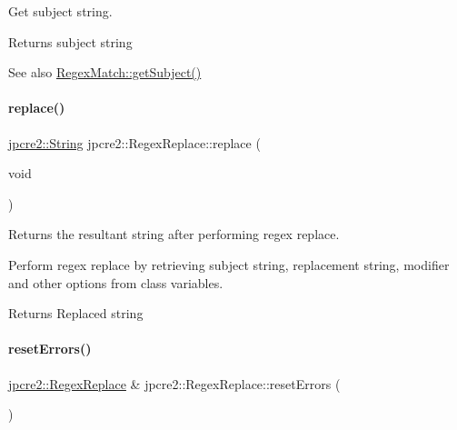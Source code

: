 Get subject string. 

\begin{DoxyReturn}{Returns}
subject string 
\end{DoxyReturn}
\begin{DoxySeeAlso}{See also}
\hyperlink{classjpcre2_1_1RegexMatch_a6ebe41305bcc7262bec814e9e737d056_a6ebe41305bcc7262bec814e9e737d056}{Regex\+Match\+::get\+Subject()} 
\end{DoxySeeAlso}
\hypertarget{classjpcre2_1_1RegexReplace_afd087fa7a9bfedec802d1a3dd7edbdd0_afd087fa7a9bfedec802d1a3dd7edbdd0}{}\label{classjpcre2_1_1RegexReplace_afd087fa7a9bfedec802d1a3dd7edbdd0_afd087fa7a9bfedec802d1a3dd7edbdd0} 
\paragraph{\texorpdfstring{replace()}{replace()}}
{\footnotesize\ttfamily \hyperlink{namespacejpcre2_a91f03070152fb228bc116c5a737f1d16}{jpcre2\+::\+String} jpcre2\+::\+Regex\+Replace\+::replace (\begin{DoxyParamCaption}\item[{void}]{ }\end{DoxyParamCaption})}



Returns the resultant string after performing regex replace. 

Perform regex replace by retrieving subject string, replacement string, modifier and other options from class variables.

\begin{DoxyReturn}{Returns}
Replaced string 
\end{DoxyReturn}
\hypertarget{classjpcre2_1_1RegexReplace_a1d708fe8f948d260a8e033cff7898f9c_a1d708fe8f948d260a8e033cff7898f9c}{}\label{classjpcre2_1_1RegexReplace_a1d708fe8f948d260a8e033cff7898f9c_a1d708fe8f948d260a8e033cff7898f9c} 
\paragraph{\texorpdfstring{reset\+Errors()}{resetErrors()}}
{\footnotesize\ttfamily \hyperlink{classjpcre2_1_1RegexReplace}{jpcre2\+::\+Regex\+Replace} \& jpcre2\+::\+Regex\+Replace\+::reset\+Errors (\begin{DoxyParamCaption}{ }\end{DoxyParamCaption})}



